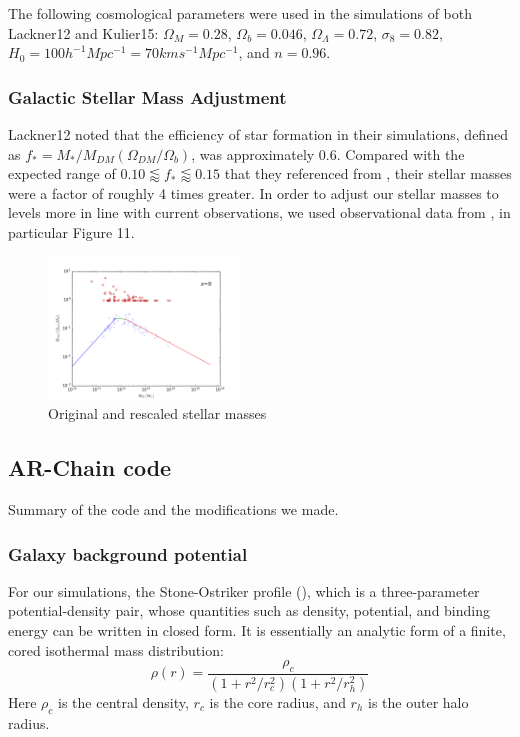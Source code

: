 \documentclass[english, apj]{emulateapj}
\begin{document}
The following cosmological parameters were used in the simulations of both Lackner12 and Kulier15:   $\Omega_M = 0.28$, $\Omega_b = 0.046$, $\Omega_\Lambda = 0.72$, $\sigma_8 = 0.82$, $H_0 = 100h^{-1}Mpc^{-1} = 70 km s^{-1} Mpc^{-1}$, and $n = 0.96$.

\subsubsection{Galactic Stellar Mass Adjustment}
Lackner12 noted that the efficiency of star formation in their simulations, defined as $f_*=M_*/M_{DM}(\Omega_{DM}/\Omega_b)$, was approximately 0.6.  Compared with the expected range of $0.10 \lessapprox f_* \lessapprox 0.15$ that they referenced from \citet{2012ApJ...746...95L}, their stellar masses were a factor of roughly 4 times greater.  In order to adjust our stellar masses to levels more in line with current observations, we used observational data from \citet{2018AstL...44....8K}, in particular Figure 11.
\begin{figure}[h!]
\begin{center}
\includegraphics[width=0.45\textwidth]{plots/stellar_to_halo_ratio.png}
\caption{Original and rescaled stellar masses}
\label{fig:stellar1}
\end{center}
\end{figure}

\subsection{AR-Chain code}
Summary of the code and the modifications we made.

\subsubsection{Galaxy background potential}
For our simulations, the Stone-Ostriker profile (\citet{2015ApJ...806L..28S}), which is a three-parameter potential-density pair, whose quantities such as density, potential, and binding energy can be written in closed form.  It is essentially an analytic form of a finite, cored isothermal mass distribution:
\begin{equation} \label{jerry}
\rho(r) = \frac{\rho_c}{(1+r^2/r_{c}^2)(1+r^2/r_{h}^2)}
\end{equation}
Here $\rho_c$ is the central density, $r_c$ is the core radius, and $r_h$ is the outer halo radius.
\end{document}
